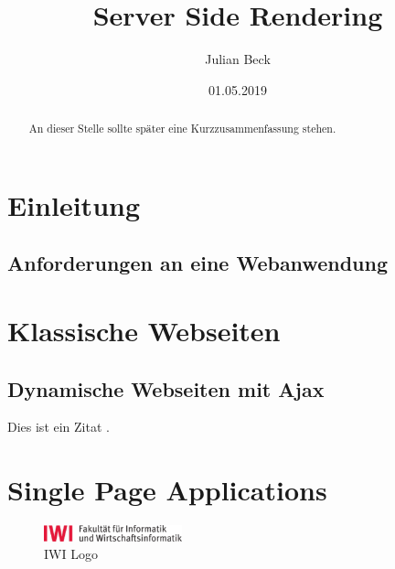 \documentclass[runningheads]{llncs}
\title{Server Side Rendering}
\author{Julian Beck}
\institute{Betreuer: Prof. Dr. rer. nat. Christian Zirpins}
\date{01.05.2019}
\begin{document}
\let\oldaddcontentsline\addcontentsline
\def\addcontentsline#1#2#3{}
\maketitle
\def\addcontentsline#1#2#3{\oldaddcontentsline{#1}{#2}{#3}}


\begin{abstract}
  An dieser Stelle sollte später eine Kurzzusammenfassung stehen.
\end{abstract}

\tableofcontents 
\newpage

\section{Einleitung}
\label{sec:Einleitung}


\subsection{Anforderungen an eine Webanwendung}
\label{subsec:Anforderungen an eine Webanwendung}


\section{Klassische Webseiten}
\label{sec:Klassische Webseiten}


\subsection{Dynamische Webseiten mit Ajax}
\label{subsec:Dynamische Webseiten mit Ajax}



Dies ist ein Zitat \cite{becker2008a}.


\section{Single Page Applications}
\label{sec:Single Page Applications}
\begin{figure}[h]
  \centering
  \includegraphics[width=4cm]{IWI-HsKA_CMYK_V01}
  \caption{IWI Logo}
  \label{fig:iwilogo}
\end{figure}
\end{document}
